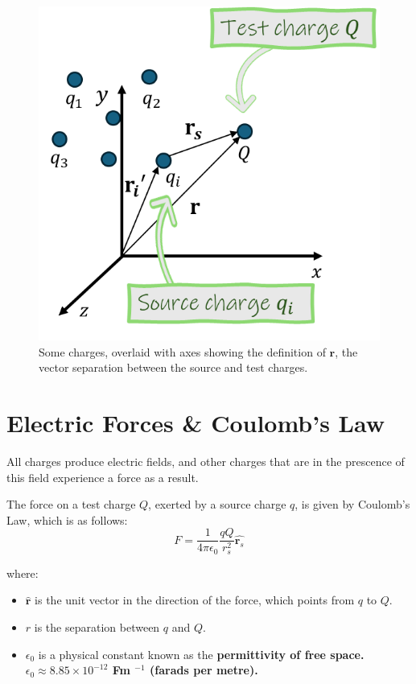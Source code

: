 \documentclass[
  letterpaper,
  DIV=11,
  numbers=noendperiod]{scrreprt}
\providecommand{\tightlist}{%
  \setlength{\itemsep}{0pt}\setlength{\parskip}{0pt}}\usepackage{longtable,booktabs,array}
\begin{document}
\begin{figure}[H]

{\centering \includegraphics{Figures/axes_r_definitions.png}

}

\caption{Some charges, overlaid with axes showing the definition of
\(\mathrm{\mathbf{r}}\), the vector separation between the source and
test charges.}

\end{figure}%

\section{Electric Forces \& Coulomb's
Law}\label{electric-forces-coulombs-law}

All charges produce electric fields, and other charges that are in the
prescence of this field experience a force as a result.

The force on a test charge \(Q\), exerted by a source charge \(q\), is
given by Coulomb's Law, which is as follows:
\[ F = \frac{1}{4\pi \epsilon_0} \frac{q Q}{r_s^2} \hat{\mathrm{\mathbf{r}}_s} \]

where:

\begin{itemize}
\tightlist
\item
  \(\hat{\mathrm{\mathbf{r}}}\) is the unit vector in the direction of
  the force, which points from \(q\) to \(Q\).
\item
  \(r\) is the separation between \(q\) and \(Q\).
\item
  \(\epsilon_0\) is a physical constant known as the
  \bf{permittivity of free space}.  $\epsilon_0 \approx 8.85 \times 10^{-12}$ Fm $^{-1}$ (farads per metre). 
\end{itemize}
\end{document}
